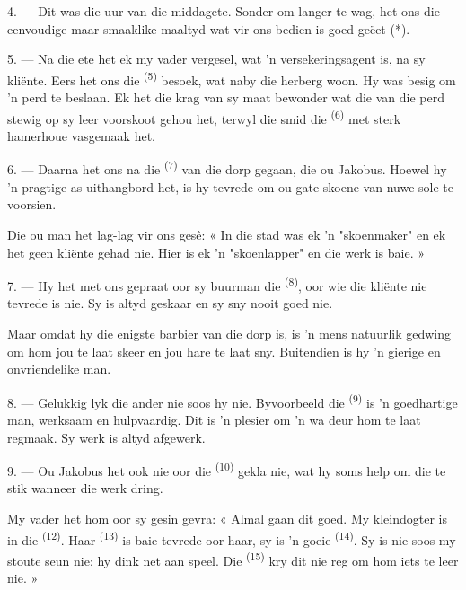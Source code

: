 4. --- Dit was die uur van die middagete. Sonder om langer te wag, het ons die eenvoudige
maar smaaklike maaltyd wat vir ons bedien is goed geëet (*).

\VUsaut{3.0mm}

5. --- Na die ete het ek my vader vergesel, wat 'n versekeringsagent is, na sy kliënte.
Eers het ons die  \textsuperscript{(5)} besoek, wat naby die herberg woon.
Hy was besig om 'n perd te beslaan. Ek het die krag van sy maat bewonder wat die
 van die perd stewig op sy leer voorskoot gehou het, terwyl die smid die
 \textsuperscript{(6)} met sterk hamerhoue vasgemaak het.

6. --- Daarna het ons na die  \textsuperscript{(7)} van die dorp
gegaan, die ou Jakobus. Hoewel hy 'n pragtige  as uithangbord het, is hy
tevrede om ou gate-skoene van nuwe sole te voorsien.

Die ou man het lag-lag vir ons gesê: « In die stad was ek 'n "skoenmaker" en ek het geen
kliënte gehad nie. Hier is ek 'n "skoenlapper" en die werk is baie. »

7. --- Hy het met ons gepraat oor sy buurman die  \textsuperscript{(8)},
oor wie die kliënte nie tevrede is nie. Sy  is altyd geskaar en sy
 sny nooit goed nie.

Maar omdat hy die enigste barbier van die dorp is, is 'n mens natuurlik gedwing om hom
jou te laat skeer en jou hare te laat sny. Buitendien is hy 'n gierige en onvriendelike
man.

8. --- Gelukkig lyk die ander  nie soos hy nie. Byvoorbeeld die
 \textsuperscript{(9)} is 'n goedhartige man, werksaam en hulpvaardig.
Dit is 'n plesier om 'n wa deur hom te laat regmaak. Sy werk is altyd afgewerk.

9. --- Ou Jakobus het ook nie oor die  \textsuperscript{(10)} gekla
nie, wat hy soms help om die  te stik wanneer die werk dring.

My vader het hom oor sy gesin gevra: « Almal gaan dit goed. My kleindogter is in die
 \textsuperscript{(12)}. Haar  \textsuperscript{(13)}
is baie tevrede oor haar, sy is 'n goeie  \textsuperscript{(14)}. Sy is
nie soos my stoute seun nie; hy dink net aan speel. Die 
\textsuperscript{(15)} kry dit nie reg om hom iets te leer nie. »

